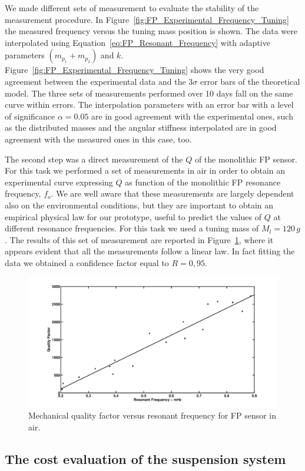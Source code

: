 We made different sets of measurement to evaluate the stability of the measurement procedure. In Figure~\ref{fig:FP_Experimental_Frequency_Tuning} the measured frequency versus the tuning mass position is shown. The data were interpolated using Equation~\ref{eq:FP_Resonant_Frequency} with adaptive parameters $(m_{p_1}+m_{p_2})$ and $k$. Figure~\ref{fig:FP_Experimental_Frequency_Tuning} shows the very good agreement between the experimental data and the $3 \sigma$ error bars of the theoretical model. The three sets of measurements performed over 10 days fall on the same curve within errors. The interpolation parameters with an error bar with a level of significance $\alpha=0.05$ are in good agreement with the experimental ones, such as the distributed masses and the angular stiffness interpolated are in good agreement with the measured ones in this case, too.

The second step was a direct measurement of the $Q$ of the monolithic FP sensor. For this task we performed a set of measurements in air in order to obtain an experimental curve expressing $Q$ as function of the monolithic FP resonance frequency, $f_{o}$. We are well aware that these measurements are largely dependent also on the environmental conditions, but they are important to obtain an empirical physical law for our prototype, useful to predict the values of $Q$ at different resonance frequencies. For this task we used a tuning mass of $M_{l} = 120 \, g$.
The results of this set of measurement are reported in Figure~\ref{fig:Q}, where it appears evident that all the measurements follow a linear law. In fact fitting the data we obtained a confidence factor equal to $R=0,95$.

\begin{figure}[h!tb]
	\centering
		\includegraphics[width=8.5 cm]{Sec_Suspensions/Figures/Q2.pdf}		
   	\caption{Mechanical quality factor versus resonant frequency for FP sensor in air.}
	  \label{fig:Q}
\end{figure}




\FloatBarrier
\subsection{The cost evaluation of the suspension system}
\label{sec:suspension_cost}


